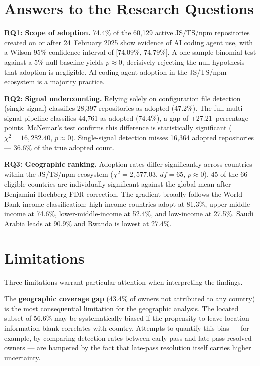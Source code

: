 \section{Answers to the Research Questions}
\label{sec:conc:answers}

\textbf{RQ1: Scope of adoption.}
74.4\% of the 60,129 active JS/TS/npm repositories created on or after 24~February 2025 show evidence of AI coding agent use, with a Wilson 95\% confidence interval of [74.09\%, 74.79\%]. A one-sample binomial test against a 5\% null baseline yields $p \approx 0$, decisively rejecting the null hypothesis that adoption is negligible. AI coding agent adoption in the JS/TS/npm ecosystem is a majority practice.

\textbf{RQ2: Signal undercounting.}
Relying solely on configuration file detection (single-signal) classifies 28,397 repositories as adopted (47.2\%). The full multi-signal pipeline classifies 44,761 as adopted (74.4\%), a gap of +27.21~percentage points. McNemar's test confirms this difference is statistically significant ($\chi^2 = 16{,}282.40$, $p \approx 0$). Single-signal detection misses 16,364 adopted repositories --- 36.6\% of the true adopted count.

\textbf{RQ3: Geographic ranking.}
Adoption rates differ significantly across countries within the JS/TS/npm ecosystem ($\chi^2 = 2{,}577.03$, $df = 65$, $p \approx 0$). 45 of the 66 eligible countries are individually significant against the global mean after Benjamini-Hochberg FDR correction. The gradient broadly follows the World Bank income classification: high-income countries adopt at 81.3\%, upper-middle-income at 74.6\%, lower-middle-income at 52.4\%, and low-income at 27.5\%. Saudi Arabia leads at 90.9\% and Rwanda is lowest at 27.4\%.

\section{Limitations}
\label{sec:conc:limitations}

Three limitations warrant particular attention when interpreting the findings.

The \textbf{geographic coverage gap} (43.4\% of owners not attributed to any country) is the most consequential limitation for the geographic analysis. The located subset of 56.6\% may be systematically biased if the propensity to leave location information blank correlates with country. Attempts to quantify this bias --- for example, by comparing detection rates between early-pass and late-pass resolved owners --- are hampered by the fact that late-pass resolution itself carries higher uncertainty.

